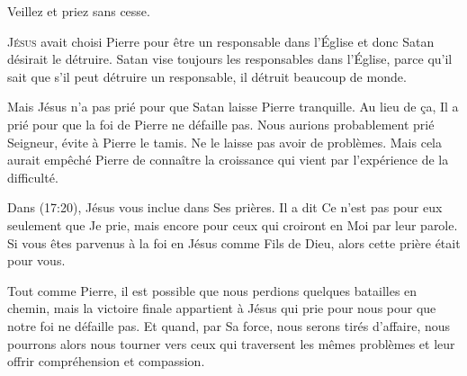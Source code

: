 Veillez et priez \ocadr sans cesse.

\dvrule







\lettrine{J}{ésus} avait choisi Pierre pour être un responsable
 dans l'Église
 et donc Satan désirait le détruire.
 Satan vise toujours les responsables dans l'Église,
 parce qu'il sait que s'il peut détruire un responsable,
 il détruit beaucoup de monde.

Mais Jésus n'a pas prié pour que Satan laisse Pierre tranquille.
 Au lieu de \c{c}a, Il a prié pour que la foi de Pierre ne défaille pas.
 Nous aurions probablement prié\frcolon{} \Og Seigneur, évite à Pierre le tamis.
 Ne le laisse pas avoir de problèmes. \Fg{}
 Mais cela aurait empêché Pierre de connaître la croissance qui vient
 par l'expérience de la difficulté.


Dans (17:20), Jésus vous inclue dans Ses prières.
 Il a dit\frcolon{} 
 \Og Ce n'est pas pour eux seulement que Je prie, mais encore pour ceux
 qui croiront en Moi par leur parole. \Fg{}
 Si vous êtes parvenus à la foi en Jésus comme Fils de Dieu,
 alors cette prière était pour vous.

Tout comme Pierre, il est possible que nous perdions quelques batailles
 en chemin, mais la victoire  finale appartient à Jésus
 qui prie pour nous pour que notre foi ne défaille pas.
 Et quand, par Sa force, nous serons tirés d'affaire,
 nous pourrons alors nous tourner vers ceux qui traversent
 les mêmes problèmes et leur offrir compréhension et compassion.

\dvrule



